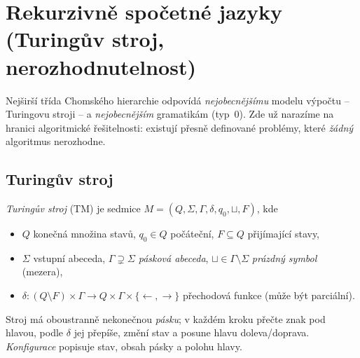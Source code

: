\documentclass[11pt,a4paper]{article}
\begin{document}
\section{Rekurzivně spočetné jazyky (Turingův stroj, nerozhodnutelnost)}

Nejširší třída Chomského hierarchie odpovídá \emph{nejobecnějšímu} modelu výpočtu -- Turingovu stroji -- a \emph{nejobecnějším} gramatikám (typ~0). Zde už narazíme na hranici algoritmické řešitelnosti: existují přesně definované problémy, které \emph{žádný} algoritmus nerozhodne.

\subsection{Turingův stroj}

\begin{definice}
\emph{Turingův stroj} (TM) je sedmice $M=(Q,\Sigma,\Gamma,\delta,q_0,\sqcup,F)$, kde
\begin{itemize}
  \item $Q$ konečná množina stavů, $q_0\in Q$ počáteční, $F\subseteq Q$ přijímající stavy,
  \item $\Sigma$ vstupní abeceda, $\Gamma\supsetneq\Sigma$ \emph{pásková abeceda}, $\sqcup\in\Gamma\setminus\Sigma$ \emph{prázdný symbol} (mezera),
  \item $\delta\colon (Q\setminus F)\times\Gamma\to Q\times\Gamma\times\{\leftarrow,\to\}$ přechodová funkce (může být parciální).
\end{itemize}
Stroj má oboustranně nekonečnou \emph{pásku}; v každém kroku přečte znak pod hlavou, podle $\delta$ jej přepíše, změní stav a posune hlavu doleva/doprava. \emph{Konfigurace} popisuje stav, obsah pásky a polohu hlavy.
\end{definice}

\begin{center}
\end{center}
\end{document}
